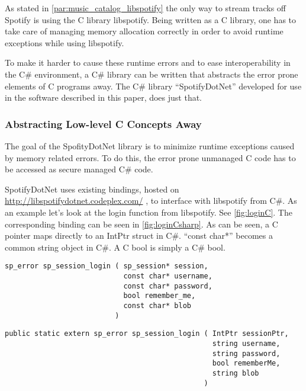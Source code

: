 As stated in \cref{par:music_catalog_libspotify} the only way to stream tracks off Spotify is using the C library libspotify. Being written as a C library, one has to take care of managing memory allocation correctly in order to avoid runtime exceptions while using libspotify. 

To make it harder to cause these runtime errors and to ease interoperability in the C\# environment, a C\# library can be written that abstracts the error prone elements of C programs away. The C\# library \enquote{SpotifyDotNet} developed for use in the software described in this paper, does just that.

\subsubsection{Abstracting Low-level C Concepts Away}
\label{ssub:abstracting_low_level_c_concepts_away}

The goal of the SpofityDotNet library is to minimize runtime exceptions caused by memory related errors. To do this, the error prone unmanaged C code has to be accessed as secure managed C\# code.

SpotifyDotNet uses existing bindings, hosted on \url{http://libspotifydotnet.codeplex.com/} , to interface with libspotify from C\#. As an example let's look at the login function from libspotify. See \cref{fig:loginC}. The corresponding binding can be seen in \cref{fig:loginCsharp}. As can be seen, a C pointer maps directly to an IntPtr struct in C\#. \enquote{const char*} becomes a common string object in C\#. A C bool is simply a C\# bool.

\begin{lstlisting}[caption = {Libspotify login function - C}, label = {fig:loginC}]
sp_error sp_session_login ( sp_session* session,
                            const char* username,
                            const char* password,
                            bool remember_me,
                            const char* blob
                          )
\end{lstlisting}

\begin{lstlisting}[caption = {Binding function for libspotify login function - C\#}, label={fig:loginCsharp}]
public static extern sp_error sp_session_login ( IntPtr sessionPtr, 
                                                 string username, 
                                                 string password, 
                                                 bool rememberMe, 
                                                 string blob 
                                               )
\end{lstlisting}

